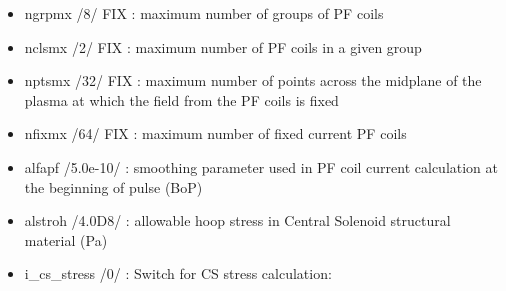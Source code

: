 \documentclass[]{article}
\providecommand{\tightlist}{%
  \setlength{\itemsep}{0pt}\setlength{\parskip}{0pt}}
\begin{document}
\begin{itemize}
\tightlist
\item
  ngrpmx /8/ FIX : maximum number of groups of PF coils
\item
  nclsmx /2/ FIX : maximum number of PF coils in a given group
\item
  nptsmx /32/ FIX : maximum number of points across the midplane of the
  plasma at which the field from the PF coils is fixed
\item
  nfixmx /64/ FIX : maximum number of fixed current PF coils
\item
  alfapf /5.0e-10/ : smoothing parameter used in PF coil current
  calculation at the beginning of pulse (BoP)
\item
  alstroh /4.0D8/ : allowable hoop stress in Central Solenoid structural
  material (Pa)
\item
  i\_cs\_stress /0/ : Switch for CS stress calculation:


\end{itemize}
\end{document}
